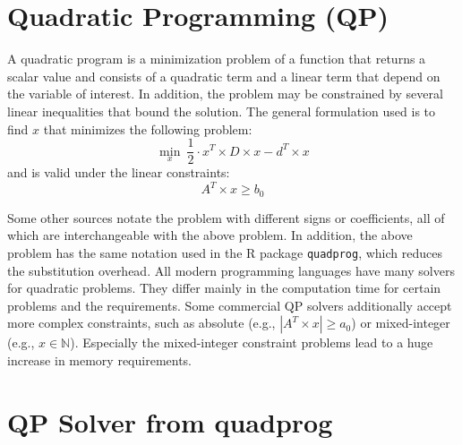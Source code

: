 \documentclass[
  oneside]{book}
\begin{document}
\hypertarget{quadratic-programming-qp}{%
\section{Quadratic Programming (QP)}\label{quadratic-programming-qp}}

A quadratic program is a minimization problem of a function that returns a scalar value and consists of a quadratic term and a linear term that depend on the variable of interest. In addition, the problem may be constrained by several linear inequalities that bound the solution. The general formulation used is to find \(x\) that minimizes the following problem:
\[
  \min\limits_{x} \ \frac{1}{2} \cdot x^T \times D \times x - d^T \times x 
\]
and is valid under the linear constraints:
\[
  A^T \times x \geq b_0
\]

Some other sources notate the problem with different signs or coefficients, all of which are interchangeable with the above problem. In addition, the above problem has the same notation used in the R package \texttt{quadprog}, which reduces the substitution overhead. All modern programming languages have many solvers for quadratic problems. They differ mainly in the computation time for certain problems and the requirements. Some commercial QP solvers additionally accept more complex constraints, such as absolute (e.g., \(|A^T \times x| \geq a_0\)) or mixed-integer (e.g., \(x \in \mathbb{N}\)). Especially the mixed-integer constraint problems lead to a huge increase in memory requirements.

\hypertarget{qp-solver-from-quadprog}{%
\section{QP Solver from quadprog}\label{qp-solver-from-quadprog}}
\end{document}
